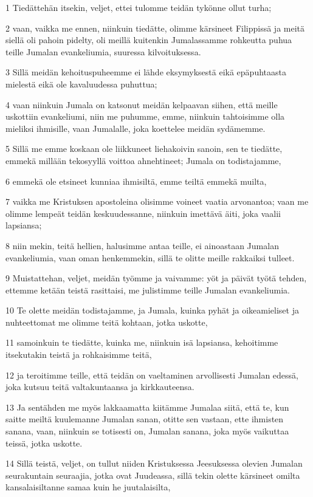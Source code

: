 \par 1 Tiedättehän itsekin, veljet, ettei tulomme teidän tykönne ollut turha;
\par 2 vaan, vaikka me ennen, niinkuin tiedätte, olimme kärsineet Filippissä ja meitä siellä oli pahoin pidelty, oli meillä kuitenkin Jumalassamme rohkeutta puhua teille Jumalan evankeliumia, suuressa kilvoituksessa.
\par 3 Sillä meidän kehoituspuheemme ei lähde eksymyksestä eikä epäpuhtaasta mielestä eikä ole kavaluudessa puhuttua;
\par 4 vaan niinkuin Jumala on katsonut meidän kelpaavan siihen, että meille uskottiin evankeliumi, niin me puhumme, emme, niinkuin tahtoisimme olla mieliksi ihmisille, vaan Jumalalle, joka koettelee meidän sydämemme.
\par 5 Sillä me emme koskaan ole liikkuneet liehakoivin sanoin, sen te tiedätte, emmekä millään tekosyyllä voittoa ahnehtineet; Jumala on todistajamme,
\par 6 emmekä ole etsineet kunniaa ihmisiltä, emme teiltä emmekä muilta,
\par 7 vaikka me Kristuksen apostoleina olisimme voineet vaatia arvonantoa; vaan me olimme lempeät teidän keskuudessanne, niinkuin imettävä äiti, joka vaalii lapsiansa;
\par 8 niin mekin, teitä hellien, halusimme antaa teille, ei ainoastaan Jumalan evankeliumia, vaan oman henkemmekin, sillä te olitte meille rakkaiksi tulleet.
\par 9 Muistattehan, veljet, meidän työmme ja vaivamme: yöt ja päivät työtä tehden, ettemme ketään teistä rasittaisi, me julistimme teille Jumalan evankeliumia.
\par 10 Te olette meidän todistajamme, ja Jumala, kuinka pyhät ja oikeamieliset ja nuhteettomat me olimme teitä kohtaan, jotka uskotte,
\par 11 samoinkuin te tiedätte, kuinka me, niinkuin isä lapsiansa, kehoitimme itsekutakin teistä ja rohkaisimme teitä,
\par 12 ja teroitimme teille, että teidän on vaeltaminen arvollisesti Jumalan edessä, joka kutsuu teitä valtakuntaansa ja kirkkauteensa.
\par 13 Ja sentähden me myös lakkaamatta kiitämme Jumalaa siitä, että te, kun saitte meiltä kuulemanne Jumalan sanan, otitte sen vastaan, ette ihmisten sanana, vaan, niinkuin se totisesti on, Jumalan sanana, joka myös vaikuttaa teissä, jotka uskotte.
\par 14 Sillä teistä, veljet, on tullut niiden Kristuksessa Jeesuksessa olevien Jumalan seurakuntain seuraajia, jotka ovat Juudeassa, sillä tekin olette kärsineet omilta kansalaisiltanne samaa kuin he juutalaisilta,
